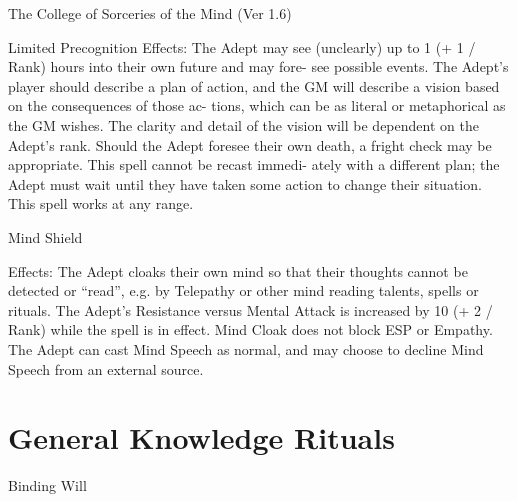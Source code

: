 \begin{Chapter}{The College of Sorceries of the Mind (Ver 1.6)}
\begin{spell}[G-6]{Limited Precognition }
Effects: The Adept may see (unclearly) up to 1 (+ 1 
/  Rank)  hours into  their  own  future  and  may  fore-
see  possible  events.  The  Adept’s  player  should 
describe a plan of action, and the GM will describe 
a  vision  based  on  the  consequences  of  those  ac-
tions, which can be as literal or metaphorical as the 
GM wishes. The clarity and detail of the vision will 
be  dependent  on  the  Adept’s  rank.  Should  the 
Adept foresee their own death, a fright check may 
be appropriate. This spell cannot be recast immedi-
ately  with  a  different  plan;  the  Adept  must  wait 
until  they  have  taken  some  action  to  change  their 
situation. This spell works at any range. 

\end{spell}

\begin{spell}[G-7]{Mind Shield }

Effects:  The  Adept  cloaks  their  own  mind  so  that 
their thoughts cannot be detected or “read”, e.g. by 
Telepathy  or  other  mind  reading  talents,  spells  or 
rituals.  The  Adept’s  Resistance  versus  Mental 
Attack  is  increased  by  10  (+  2  /  Rank)  while  the 
spell  is  in  effect.  Mind  Cloak  does  not  block  ESP 
or  Empathy.  The  Adept  can  cast  Mind  Speech  as 
normal,  and  may  choose  to  decline  Mind  Speech 
from an external source. 

\end{spell}

\section{General Knowledge Rituals}

\begin{ritual}[Q-1]{Binding Will }


\end{ritual}
\end{Chapter}
